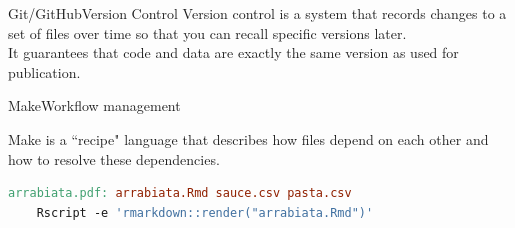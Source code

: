 \documentclass[12pt,t]{beamer}
\begin{document}
{{
  \begin{frame}[plain]
  \end{frame}
}
{
  \begin{frame}[plain]
  \end{frame}
}
\begin{frame}[c]{Git/GitHub\textemdash{}Version Control}
  Version control is a system that records changes to a set of files
  over time so that you can recall specific versions later.\\
  \vspace{10mm}
  It guarantees that code and data are exactly the same version as used for
  publication.
\end{frame}

\begin{frame}[c, fragile]{Make\textemdash{}Workflow management}

Make is a ``recipe" language that describes how files depend on each other and how to resolve these dependencies.
\vspace{10mm}
\begin{lstlisting}[language=make,basicstyle=\ttfamily\scriptsize]
arrabiata.pdf: arrabiata.Rmd sauce.csv pasta.csv
    Rscript -e 'rmarkdown::render("arrabiata.Rmd")'


\end{lstlisting}
\end{frame}}
\end{document}
